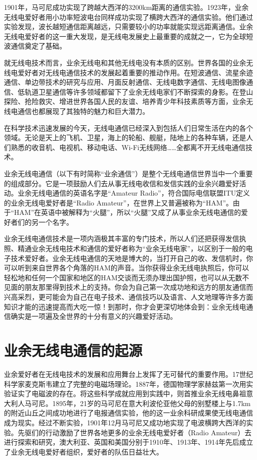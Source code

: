 \documentclass[12pt,UTF8]{ctexbook}
\begin{document}
1901年，马可尼成功实现了跨越大西洋的3200km距离的通信实验。1923年，业余无线电爱好者用小功率短波电台同样成功实现了横跨大西洋的通信实验。他们通过实验发现，波长越短通信距离越远，只需要较小的功率就能实现远距离通信。业余无线电爱好者的这一重大发现，是无线电发展史上最重要的成就之一，它为全球短波通信奠定了基础。

就无线电技术而言，业余无线电和其他无线电没有本质的区别。世界各国的业余无线电爱好者对无线电通信技术的发展起着重要的推动作用。在短波通信、流星余迹通信、单边带技术的研究与应用、月面反射通信、无线电数字通信、无线电图像通信、低轨道卫星通信等许多领域都留下了业余无线电家们不断探索的身影。在登山探险、抢险救灾、增进世界各国人民的友谊、培养青少年科技素质等方面，业余无线电通信也都展现了其独特的魅力和巨大潜力。

在科学技术迅速发展的今天，无线电通信已经深入到包括人们日常生活在内的各个领域。无论是天上的飞机、卫星，海上的轮船、舰艇，陆地上的各种车辆，还是人们熟悉的收音机、电视机、移动电话、Wi-Fi无线网络……全都离不开无线电通信技术。

业余无线电通信（以下有时简称“业余通信”）是整个无线电通信世界当中一个重要的组成部分。它是一项鼓励人们去从事无线电收信和发信实践的业余兴趣爱好活动。业余无线电通信的英语名字是“Amateur Radio”，符合国际电信联盟ITU定义的业余无线电爱好者是“Radio Amateur”，在世界上又普遍被称为“HAM”。由于“HAM”在英语中被解释为“火腿”，所以“火腿”又成了从事业余无线电通信的爱好者们的另一个名字。

业余无线电通信技术是一项内涵极其丰富的专门技术，所以人们还把获得发信执照、精通业余无线电技术和通信的爱好者称为“业余无线电家”，以区别于一般的电子技术爱好者。业余无线电通信的天地是博大的，当打开自己的收、发信机时，你可以听到来自世界各个角落的HAM的声音。当你获得业余无线电执照后，你可以轻松地和任何一个国家和地区的HAM交谈而无须办理出国护照，也可以从无数不见面的朋友那里得到技术上的支持。你会为自己第一次成功地和远方的朋友通信而兴高采烈，更可能会为自己在电子技术、通信技巧以及语言、人文地理等许多方面知识才能的迅速提高而大吃一惊！到那时，你才会更深切地体会到：业余无线电通信确实是一项遍及全世界的十分有意义的兴趣爱好活动。

\section{业余无线电通信的起源}

业余爱好者在无线电技术的发展和应用舞台上发挥了无可替代的重要作用。17世纪科学家麦克斯韦建立了完整的电磁场理论。1887年，德国物理学家赫兹第一次用实验证实了电磁波的存在。将这些科学成就应用到实践中，则首推业余无线电鼻祖意大利人马可尼。1895年，21岁的马可尼在意大利波伦亚他父母的别墅楼上与1.7km的附近山丘之间成功地进行了电报通信实验，他的这一业余科研成果使无线电通信成为现实。经过不断实验，1901年12月马可尼又成功地实现了电波横跨大西洋的实验。先驱们的行动激励了世界各地更多的业余无线电爱好者（Radio Amateur）去进行探索和研究，澳大利亚、英国和美国分别于1910年、1913年、1914年先后成立了业余无线电爱好者组织，爱好者的队伍日益壮大。
\end{document}
